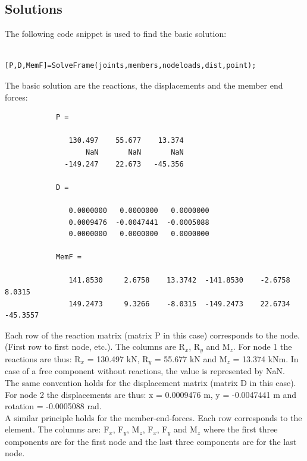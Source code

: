 \documentclass[a4paper]{article}
\begin{document}
	\subsection{Solutions}
		\begin{sloppypar}
			The following code snippet is used to find the basic solution:
		\end{sloppypar}
		\begin{verbatim}
			[P,D,MemF]=SolveFrame(joints,members,nodeloads,dist,point);
		\end{verbatim}
		\begin{sloppypar}
			The basic solution are the reactions, the displacements and the member end forces:
		\end{sloppypar}
		\begin{verbatim}
			P =

			   130.497    55.677    13.374
				   NaN       NaN       NaN
			  -149.247    22.673   -45.356

			D =

			   0.0000000   0.0000000   0.0000000
			   0.0009476  -0.0047441  -0.0005088
			   0.0000000   0.0000000   0.0000000

			MemF =

			   141.8530     2.6758    13.3742  -141.8530    -2.6758     8.0315
			   149.2473     9.3266    -8.0315  -149.2473    22.6734   -45.3557
		\end{verbatim}
		\begin{sloppypar}
			Each row of the reaction matrix (matrix P in this case) corresponds to the node. (First row to first node, etc.).
			The columns are R$_x$, R$_y$ and M$_z$. For node 1 the reactions are thus: R$_x$ = 130.497 kN, R$_y$ = 55.677 kN and M$_z$ = 13.374 kNm.
			In case of a free component without reactions, the value is represented by NaN.\\
			The same convention holds for the displacement matrix (matrix D in this case). For node 2 the displacements are thus:
			x = 0.0009476 m, y = -0.0047441 m and rotation = -0.0005088 rad.\\
			A similar principle holds for the member-end-forces. Each row corresponds to the element. The columns are: F$_x$, F$_y$, M$_z$, F$_x$, F$_y$ and M$_z$ where 
			the first three components are for the first node and the last three components are for the last node.
			
		\end{sloppypar}

\newpage
\end{document}
